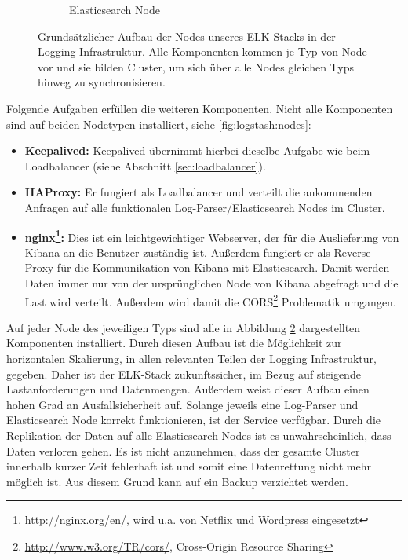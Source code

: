 \begin{figure}[ht]
\begin{subfigure}[b]{0.585\textwidth}
        \caption{Elasticsearch Node}
        \label{fig:logstash:esnode}
    \end{subfigure}
    \caption[Aufbau der ELK-Stack Node]{Grundsätzlicher Aufbau der Nodes unseres ELK-Stacks in der Logging Infrastruktur. Alle Komponenten kommen je Typ von Node vor und sie bilden Cluster, um sich über alle Nodes gleichen Typs hinweg zu synchronisieren.}
    \label{fig:logstash:nodes}
\end{figure}

Folgende Aufgaben erfüllen die weiteren Komponenten. Nicht alle Komponenten sind auf beiden Nodetypen installiert, siehe \autoref{fig:logstash:nodes}:
\begin{itemize}
 \item \textbf{Keepalived:} Keepalived übernimmt hierbei dieselbe Aufgabe wie beim Loadbalancer (siehe Abschnitt \ref{sec:loadbalancer}).
 \item \textbf{HAProxy:} Er fungiert als Loadbalancer und verteilt die ankommenden Anfragen auf alle funktionalen Log-Parser/Elasticsearch Nodes im Cluster.
 \item \textbf{nginx\footnote{\url{http://nginx.org/en/}, wird u.a. von Netflix und Wordpress eingesetzt}:} Dies ist ein leichtgewichtiger Webserver, der für die Auslieferung von Kibana an die Benutzer zuständig ist. Außerdem fungiert er als Reverse-Proxy für die Kommunikation von Kibana mit Elasticsearch. Damit werden Daten immer nur von der ursprünglichen Node von Kibana abgefragt und die Last wird verteilt. Außerdem wird damit die CORS\footnote{\url{http://www.w3.org/TR/cors/}, Cross-Origin Resource Sharing} Problematik umgangen.
\end{itemize}

Auf jeder Node des jeweiligen Typs sind alle in Abbildung \ref{fig:logstash:nodes} dargestellten Komponenten installiert. Durch diesen Aufbau ist die Möglichkeit zur horizontalen Skalierung, in allen relevanten Teilen der Logging Infrastruktur, gegeben. Daher ist der ELK-Stack zukunftssicher, im Bezug auf steigende Lastanforderungen und Datenmengen. Außerdem weist dieser Aufbau einen hohen Grad an Ausfallsicherheit auf. Solange jeweils eine Log-Parser und Elasticsearch Node korrekt funktionieren, ist der Service verfügbar. Durch die Replikation der Daten auf alle Elasticsearch Nodes ist es unwahrscheinlich, dass Daten verloren gehen. Es ist nicht anzunehmen, dass der gesamte Cluster innerhalb kurzer Zeit fehlerhaft ist und somit eine Datenrettung nicht mehr möglich ist. Aus diesem Grund kann auf ein Backup verzichtet werden.

